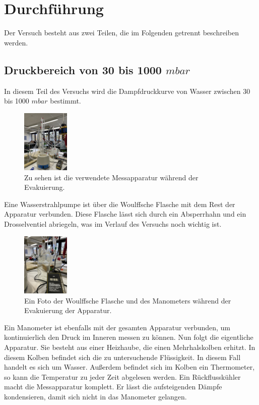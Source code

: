 \section{Durchführung}
\label{sec:Durchführung}

Der Versuch besteht aus zwei Teilen, die im Folgenden getrennt beschreiben werden.
\subsection{Druckbereich von 30 bis 1000 $mbar$}
In diesem Teil des Versuchs wird die Dampfdruckkurve von Wasser zwischen 30 bis 1000 $mbar$ bestimmt.
\begin{figure}
    \centering
    \includegraphics[height=3cm, angle=270]{content/Verwendete_Messapparatur.jpeg}
    \caption{Zu sehen ist die verwendete Messapparatur während der Evakuierung.}
    \label{Abb:Messapparatur}
\end{figure}
Eine Wasserstrahlpumpe ist über die Woulffsche Flasche mit dem Rest der Apparatur verbunden.
Diese Flasche lässt sich durch ein Absperrhahn und ein Drosselventiel abriegeln, was im Verlauf des Versuchs noch wichtig ist.
\begin{figure}
    \centering
    \includegraphics[height=3cm, angle=270]{content/Woulffsche_Flasche.jpeg}
    \caption{Ein Foto der Woulffsche Flasche und des Manometers während der Evakuierung der Apparatur.}
    \label{Abb:Woulffsche_Flasche}
\end{figure}
Ein Manometer ist ebenfalls mit der gesamten Apparatur verbunden, um kontinuierlich den Druck im Inneren messen zu können.
Nun folgt die eigentliche Apparatur.
Sie besteht aus einer Heizhaube, die einen Mehrhalskolben erhitzt.
In diesem Kolben befindet sich die zu untersuchende Flüssigkeit.
In diesem Fall handelt es sich um Wasser.
Außerdem befindet sich im Kolben ein Thermometer, so kann die Temperatur zu jeder Zeit abgelesen werden.
Ein Rückflusskühler macht die Messapparatur komplett.
Er lässt die aufsteigenden Dämpfe kondensieren, damit sich nicht in das Manometer gelangen.

